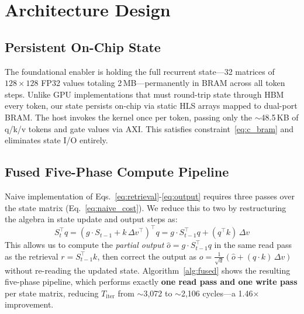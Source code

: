 \documentclass[conference]{IEEEtran}
\begin{document}
\section{Architecture Design}

\subsection{Persistent On-Chip State}

The foundational enabler is holding the full recurrent state---32 matrices
of $128 \times 128$ FP32 values totaling 2\,MB---permanently in BRAM
across all token steps. Unlike GPU implementations that must round-trip
state through HBM every token, our state persists on-chip via static HLS
arrays mapped to dual-port BRAM. The host invokes the kernel once per
token, passing only the $\sim$48.5\,KB of q/k/v tokens and gate values
via AXI. This satisfies constraint~\eqref{eq:c_bram} and eliminates
state I/O entirely.

\subsection{Fused Five-Phase Compute Pipeline}
\label{sec:fused}

Naive implementation of Eqs.~\eqref{eq:retrieval}-\eqref{eq:output}
requires three passes over the state matrix
(Eq.~\eqref{eq:naive_cost}). We reduce this to two by restructuring the 
algebra in state update and output steps 
as: 
%
\begin{equation}
  S_t^{\!\top} q = (g \cdot S_{t-1} + k\,\Delta v^{\!\top})^{\!\top} q
  = g \cdot S_{t-1}^{\!\top} q + (q^{\!\top}\! k)\,\Delta v
  \label{eq:fused}
\end{equation}
%
This allows us to compute the \emph{partial output}
$\hat{o} = g \cdot S_{t-1}^{\!\top} q$ in the same read pass as the
retrieval $r = S_{t-1}^{\!\top} k$, then correct the output as
$o = \tfrac{1}{\sqrt{d}}(\hat{o} + (q \cdot k)\,\Delta v)$ without
re-reading the updated state. Algorithm~\ref{alg:fused} shows the
resulting five-phase pipeline, which performs exactly \textbf{one read
pass and one write pass} per state matrix, reducing
$T_{\mathrm{iter}}$ from $\sim$3{,}072 to $\sim$2{,}106 cycles---a
1.46$\times$ improvement.
\end{document}
